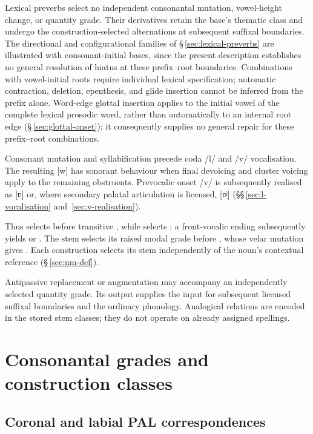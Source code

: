 Lexical preverbs select no independent consonantal mutation, vowel-height
change, or quantity grade. Their derivatives retain the base's thematic class
and undergo the construction-selected alternations at subsequent suffixal
boundaries. The directional and configurational families of
§\,\ref{sec:lexical-preverbs} are illustrated with consonant-initial
bases, since the present description establishes no general resolution of
hiatus at these prefix--root boundaries. Combinations with
vowel-initial roots require individual lexical specification; automatic
contraction, deletion, epenthesis, and glide insertion cannot be inferred from
the prefix alone. Word-edge glottal insertion applies to the initial
vowel of the complete lexical prosodic word, rather than automatically to
an internal root edge (§\,\ref{sec:glottal-onset}); it consequently
supplies no general repair for these prefix--root combinations.

Consonant mutation and syllabification precede coda /l/ and /v/
vocalisation. The resulting [w] has sonorant behaviour when final devoicing
and cluster voicing apply to the remaining obstruents. Prevocalic onset /v/
is subsequently realised as [ʋ] or, where secondary palatal articulation is
licensed, [ʋʲ] (§§\,\ref{sec:l-vocalisation} and~\ref{sec:v-realisation}).

Thus  selects  before transitive , while
 selects ; a front-vocalic ending subsequently yields
 or . The stem  selects its raised modal
grade before , whose velar mutation gives .
Each construction selects its stem independently of the noun's contextual
reference (§\,\ref{sec:nm-def}).

Antipassive replacement or augmentation may accompany an independently
selected quantity grade. Its output supplies the input for subsequent
licensed suffixal boundaries and the ordinary phonology. Analogical
relations are encoded in the stored stem classes; they do not operate on
already assigned spellings.

\section{Consonantal grades and construction classes}

\subsection{Coronal and labial PAL correspondences}\label{sec:soft-coronals}

